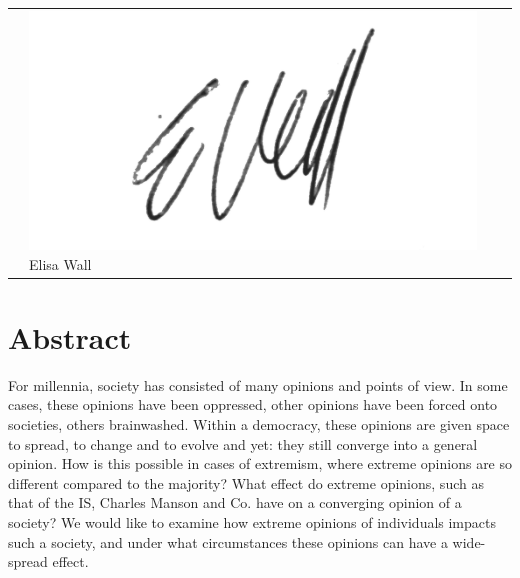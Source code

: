 \documentclass[11pt]{article}
\begin{document}
\begin{center}
\begin{tabular}{@{}p{1cm}@{}p{5cm}@{}@{}p{5cm}@{}@{}p{5cm}@{}}
\begin{minipage}{5cm}
\end{minipage}
&
\begin{minipage}{5cm}
\includegraphics[width=\linewidth]{2017-12-18_21-09_Seite_2.pdf}	
\vspace{4mm}\large Elisa Wall
	 \vspace{\baselineskip}
	 

\end{minipage}
\end{tabular}


\end{center}
\newpage









\tableofcontents

\newpage




\section{Abstract}
For millennia, society has consisted of many opinions and points of view. In some cases, these opinions have been oppressed, other opinions have been forced onto societies, others brainwashed. Within a democracy, these opinions are given space to spread, to change and to evolve and yet: they still converge into a general opinion. How is this possible in cases of extremism, where extreme opinions are so different compared to the majority? What effect do extreme opinions, such as that of the IS, Charles Manson and Co. have on a converging opinion of a society? We would like to examine how extreme opinions of individuals impacts such a society, and under what circumstances these opinions can have a wide-spread effect.
\end{document}
